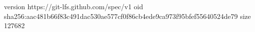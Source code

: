 version https://git-lfs.github.com/spec/v1
oid sha256:aac481b66f83c491dac530ae577cf0f86cb4ede9ca973f95bfef55640524de79
size 127682
